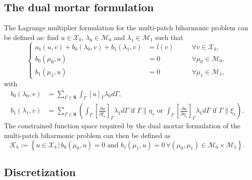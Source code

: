 \subsection{The dual mortar formulation}
The Lagrange multiplier formulation for the multi-patch biharmonic problem can be defined as: find $u\in{\mathcal{X}_b}$, $\lambda_0\in{\mathcal{M}_0}$ and $\lambda_1\in{\mathcal{M}_1}$ such that
\begin{equation}
  \left\{\begin{alignedat}{2}
    a_b(u,v)+b_0(\lambda_0,v)+b_1(\lambda_1,v)&=l(v)\quad&&\forall v\in{\mathcal{X}_b},\\
    b_0(\mu_0,u)&=0 \quad&&\forall \mu_0\in{\mathcal{M}_0},\\
    b_1(\mu_1,u)&=0 \quad&&\forall \mu_1\in{\mathcal{M}_1},
  \end{alignedat}\right.\label{eq:biharmonic_mixed}
\end{equation}
with
\begin{subequations}
  \begin{align}
    b_0(\lambda_0,v) & =\sum_{\Gamma\in\mathbf{S}}\int_\Gamma[u]_{\Gamma}\lambda_0d\Gamma,\label{eq:operator-b0}                                                                                                                                                                                                                          \\
    b_1(\lambda_1,v) & =\sum_{\Gamma\in\mathbf{S}}\left(\int_\Gamma\left[\frac{\partial{u}}{\partial{\xi_s}}\right]_{\Gamma}\lambda_1d\Gamma\text{ if }\Gamma\parallel\eta_s\text{ or }\int_\Gamma\left[\frac{\partial{u}}{\partial{\eta_s}}\right]_{\Gamma}\lambda_1d\Gamma\text{ if }\Gamma\parallel\xi_s\right).\label{eq:operator-b1}
  \end{align}
\end{subequations}
The constrained function space required by the dual mortar formulation of the multi-patch biharmonic problem can then be defined as
\begin{equation}
  \mathcal{K}_b:=\left\{u\in{}\mathcal{X}_b\,\vert\,b_0(\mu_0,u)=0 \text{ and }b_1(\mu_1,u)=0\,\forall(\mu_0,\mu_1)\in{\mathcal{M}_0\times{}\mathcal{M}_1}\right\}.\label{eq:constrained_space}
\end{equation}

\subsection{Discretization}

